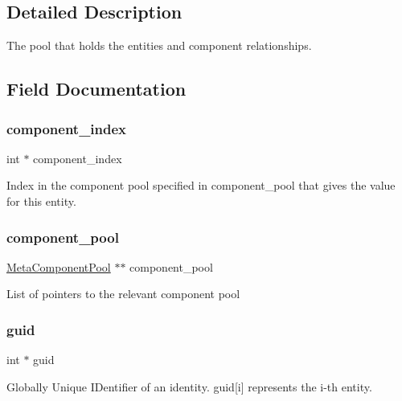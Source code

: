 \subsection{Detailed Description}
The pool that holds the entities and component relationships. 

\subsection{Field Documentation}
\mbox{\label{struct_entity_pool_a2de99c265dcc7ac0f0fa20efeec9516f}} 
\subsubsection{\texorpdfstring{component\+\_\+index}{component\_index}}
{\footnotesize\ttfamily int $\ast$ component\+\_\+index}

Index in the component pool specified in {\ttfamily component\+\_\+pool} that gives the value for this entity. \mbox{\label{struct_entity_pool_a9eecab6811f2cbb7343d9638605cc74d}} 
\subsubsection{\texorpdfstring{component\+\_\+pool}{component\_pool}}
{\footnotesize\ttfamily \mbox{\hyperlink{struct_meta_component_pool}{Meta\+Component\+Pool}} $\ast$$\ast$ component\+\_\+pool}

List of pointers to the relevant component pool \mbox{\label{struct_entity_pool_a7ce754a177a158c41e7eae14122a3603}} 
\subsubsection{\texorpdfstring{guid}{guid}}
{\footnotesize\ttfamily int $\ast$ guid}

Globally Unique I\+Dentifier of an identity. {\ttfamily guid\mbox{[}i\mbox{]}} represents the i-\/th entity. \mbox{\label{struct_entity_pool_aefadcdd88d2e6364fd584f35c374d324}} 

